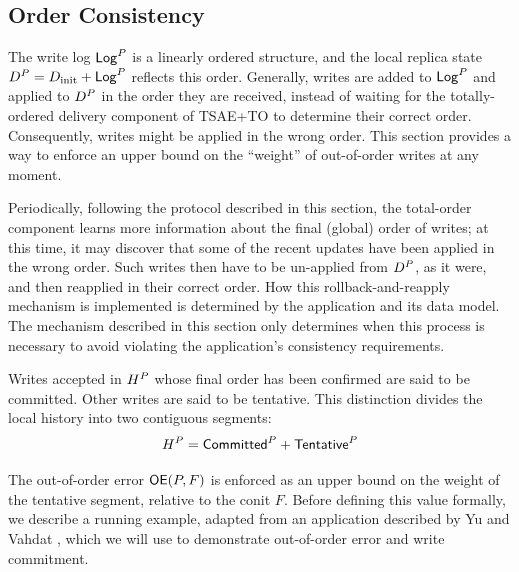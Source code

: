 \documentclass[]             %
{NASA}                       %
\theoremstyle{definition}
\begin{document}
\subsection{Order Consistency}
\label{ssec:conit-order-consistency}
The write log $\mathsf{Log}^{P}$ is a linearly ordered structure, and the local
replica state $D^{P} = D_\textrm{init} + \mathsf{Log}^{P}$ reflects this
order. Generally, writes are added to $\mathsf{Log}^{P}$ and applied to
$D^{P}$ in the order they are received, instead of waiting for
the totally-ordered delivery component of TSAE+TO to determine their
correct order. Consequently, writes might be applied in the wrong
order. This section provides a way to enforce an upper bound on the
``weight'' of out-of-order writes at any moment.

Periodically, following the protocol described in this section, the
total-order component learns more information about the final (global)
order of writes; at this time, it may discover that some of the recent
updates have been applied in the wrong order. Such writes then have to
be un-applied from $D^{P}$, as it were, and then reapplied in their
correct order. How this rollback-and-reapply mechanism is implemented
is determined by the application and its data model. The mechanism
described in this section only determines when this process is
necessary to avoid violating the application's consistency
requirements.

Writes accepted in $H^{P}$ whose final order has been
confirmed are said to be committed. Other writes are said to be
tentative. This distinction divides the local history into two
contiguous segments:
\begin{equation}
  H^{P} = \mathsf{Committed}^{P} + \mathsf{Tentative}^{P} \label{eqn:conit-history-segments}
\end{equation}

The out-of-order error $\mathsf{OE}(P, F)$ is enforced as an upper bound on
the weight of the tentative segment, relative to the conit $F$. Before
defining this value formally, we describe a running example, adapted
from an application described by Yu and Vahdat \cite{2002tact}, which
we will use to demonstrate out-of-order error and write
commitment.
\end{document}
